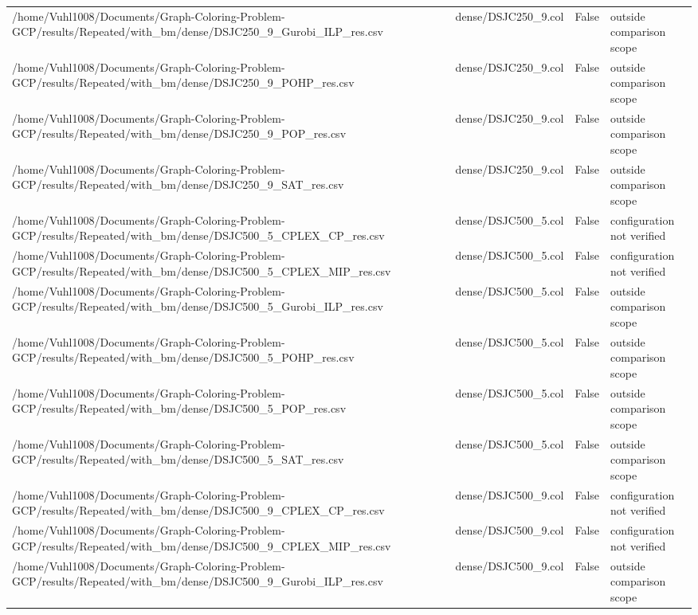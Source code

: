 \begin{table}[htbp]
\begin{tabular}{llll}
/home/Vuhl1008/Documents/Graph-Coloring-Problem-GCP/results/Repeated/with\_bm/dense/DSJC250\_9\_Gurobi\_ILP\_res.csv & dense/DSJC250\_9.col & False & outside comparison scope \\
/home/Vuhl1008/Documents/Graph-Coloring-Problem-GCP/results/Repeated/with\_bm/dense/DSJC250\_9\_POHP\_res.csv & dense/DSJC250\_9.col & False & outside comparison scope \\
/home/Vuhl1008/Documents/Graph-Coloring-Problem-GCP/results/Repeated/with\_bm/dense/DSJC250\_9\_POP\_res.csv & dense/DSJC250\_9.col & False & outside comparison scope \\
/home/Vuhl1008/Documents/Graph-Coloring-Problem-GCP/results/Repeated/with\_bm/dense/DSJC250\_9\_SAT\_res.csv & dense/DSJC250\_9.col & False & outside comparison scope \\
/home/Vuhl1008/Documents/Graph-Coloring-Problem-GCP/results/Repeated/with\_bm/dense/DSJC500\_5\_CPLEX\_CP\_res.csv & dense/DSJC500\_5.col & False & configuration not verified \\
/home/Vuhl1008/Documents/Graph-Coloring-Problem-GCP/results/Repeated/with\_bm/dense/DSJC500\_5\_CPLEX\_MIP\_res.csv & dense/DSJC500\_5.col & False & configuration not verified \\
/home/Vuhl1008/Documents/Graph-Coloring-Problem-GCP/results/Repeated/with\_bm/dense/DSJC500\_5\_Gurobi\_ILP\_res.csv & dense/DSJC500\_5.col & False & outside comparison scope \\
/home/Vuhl1008/Documents/Graph-Coloring-Problem-GCP/results/Repeated/with\_bm/dense/DSJC500\_5\_POHP\_res.csv & dense/DSJC500\_5.col & False & outside comparison scope \\
/home/Vuhl1008/Documents/Graph-Coloring-Problem-GCP/results/Repeated/with\_bm/dense/DSJC500\_5\_POP\_res.csv & dense/DSJC500\_5.col & False & outside comparison scope \\
/home/Vuhl1008/Documents/Graph-Coloring-Problem-GCP/results/Repeated/with\_bm/dense/DSJC500\_5\_SAT\_res.csv & dense/DSJC500\_5.col & False & outside comparison scope \\
/home/Vuhl1008/Documents/Graph-Coloring-Problem-GCP/results/Repeated/with\_bm/dense/DSJC500\_9\_CPLEX\_CP\_res.csv & dense/DSJC500\_9.col & False & configuration not verified \\
/home/Vuhl1008/Documents/Graph-Coloring-Problem-GCP/results/Repeated/with\_bm/dense/DSJC500\_9\_CPLEX\_MIP\_res.csv & dense/DSJC500\_9.col & False & configuration not verified \\
/home/Vuhl1008/Documents/Graph-Coloring-Problem-GCP/results/Repeated/with\_bm/dense/DSJC500\_9\_Gurobi\_ILP\_res.csv & dense/DSJC500\_9.col & False & outside comparison scope \\

\end{tabular}
\end{table}
